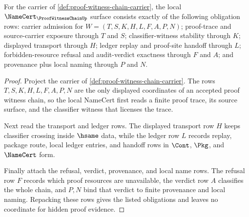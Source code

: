 \begin{theorem}
\label{thm:proof-witness-chain-namecert-obligations}
For the carrier of \autoref{def:proof-witness-chain-carrier}, the local $\NameCert_{\ProofWitnessChainUp}$ surface consists exactly of the following obligation rows: carrier admission for $W=(T,S,K,H,L,F,A,P,N)$; proof-trace and source-carrier exposure through $T$ and $S$; classifier-witness stability through $K$; displayed transport through $H$; ledger replay and proof-site handoff through $L$; forbidden-resource refusal and audit-verdict exactness through $F$ and $A$; and provenance plus local naming through $P$ and $N$.
\end{theorem}
\begin{proof}
Project the carrier of \autoref{def:proof-witness-chain-carrier}. The rows $T,S,K,H,L,F,A,P,N$ are the only displayed coordinates of an accepted proof witness chain, so the local NameCert first reads a finite proof trace, its source surface, and the classifier witness that licenses the trace.

Next read the transport and ledger rows. The displayed transport row $H$ keeps classifier crossing inside $\hsame$ data, while the ledger row $L$ records replay, package route, local ledger entries, and handoff rows in $\Cont$, $\Pkg$, and $\NameCert$ form.

Finally attach the refusal, verdict, provenance, and local name rows. The refusal row $F$ records which proof resources are unavailable, the verdict row $A$ classifies the whole chain, and $P,N$ bind that verdict to finite provenance and local naming. Repacking these rows gives the listed obligations and leaves no coordinate for hidden proof evidence.
\end{proof}

